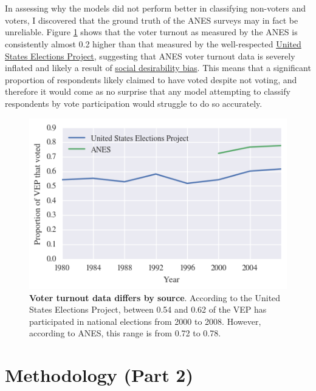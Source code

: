 \documentclass{article}
\begin{document}
	\hfill \\\\
	In assessing why the models did not perform better in classifying non-voters and voters, I discovered that the ground truth of the ANES surveys may in fact be unreliable. Figure \ref{fig:voter_turnout} shows that the voter turnout as measured by the ANES is consistently almost 0.2 higher than that measured by the well-respected \href{http://www.electproject.org/national-1789-present}{United States Elections Project}, suggesting that ANES voter turnout data is severely inflated and likely a result of \href{https://en.wikipedia.org/wiki/Social_desirability_bias}{social desirability bias}. This means that a significant proportion of respondents likely claimed to have voted despite not voting, and therefore it would come as no surprise that any model attempting to classify respondents by vote participation would struggle to do so accurately.
	
	\begin{figure}[h!]
		\begin{center}
			\includegraphics*[width=0.5\linewidth]{voter_turnout}
			\caption{\textbf{Voter turnout data differs by source}. According to the United States Elections Project, between 0.54 and 0.62 of the VEP has participated in national elections from 2000 to 2008. However, according to ANES, this range is from 0.72 to 0.78.}
			\label{fig:voter_turnout}
		\end{center}
	\end{figure}

	\section{Methodology (Part 2)}
	
\end{document}
